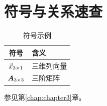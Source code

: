 \chapter{符号与关系速查}
\label{app:symbols}

\begin{table}[htbp]
  \centering
  \caption{符号示例}\label{tab:symbols}
  \begin{tabular}{cl}
    \toprule
    符号 & 含义 \\
    \midrule
    \(\vec{x}_{3\times 1}\) & 三维列向量 \\
    \(\bm{A}_{3\times 3}\) & 三阶矩阵 \\
    \bottomrule
  \end{tabular}
\end{table}

参见第\ref{chap:chapter3}章。
